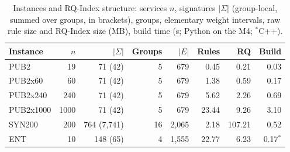 \begin{table}[t]
\centering\footnotesize
\setlength{\tabcolsep}{2.5pt}
\caption{Instances and RQ-Index structure: services $n$, signatures $|\Sigma|$ (group-local, summed over groups, in brackets), groups, elementary weight intervals, raw rule size and RQ-Index size (MB), build time (s; Python on the M4; $^*$C++).}
\label{tab:data}
\begin{tabular}{@{}lrrrrrrr@{}}
\toprule
Instance & $n$ & $|\Sigma|$ & Groups & $|E|$ & Rules & RQ & Build\\
\midrule
PUB2 & 19 & 71 (42) & 5 & 679 & 0.45 & 0.21 & 0.03\\
PUB2x60 & 60 & 71 (42) & 5 & 679 & 1.38 & 0.59 & 0.17\\
PUB2x240 & 240 & 71 (42) & 5 & 679 & 5.62 & 2.26 & 0.69\\
PUB2x1000 & 1000 & 71 (42) & 5 & 679 & 23.44 & 9.26 & 3.10\\
SYN200 & 200 & 764 (7{,}741) & 16 & 2{,}065 & 2.18 & 107.21 & 0.52\\
ENT & 10 & 148 (65) & 4 & 1{,}555 & 22.77 & 6.23 & 0.17$^*$\\
\bottomrule
\end{tabular}
\end{table}
